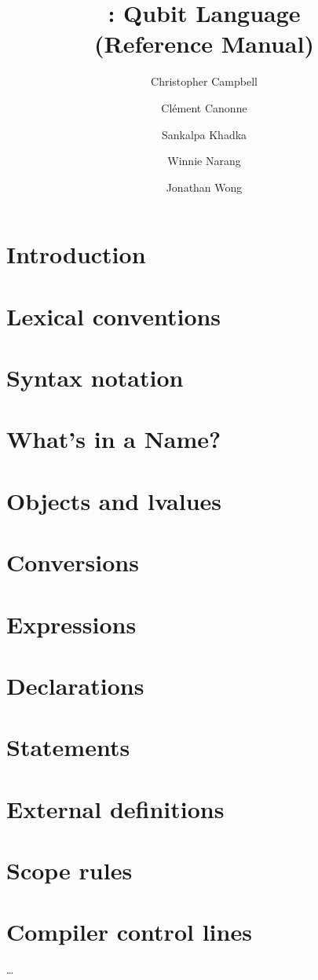 \documentclass[11pt]{report}
\title{\QL: Qubit Language\\ \Large(Reference Manual)}
\author{
  Christopher Campbell
  \and Cl\'ement Canonne
  \and Sankalpa Khadka
  \and Winnie Narang
  \and Jonathan Wong
}
\begin{document}
\maketitle
\tableofcontents

\chapter{Introduction}
\chapter{Lexical conventions}

\chapter{Syntax notation}
\chapter{What's in a Name?}
\chapter{Objects and lvalues}
\chapter{Conversions}
\chapter{Expressions}
\chapter{Declarations}
\chapter{Statements}
\chapter{External definitions}
\chapter{Scope rules}
\chapter{Compiler control lines}
\dots
\end{document}
